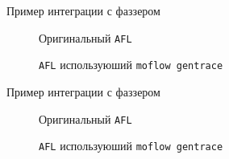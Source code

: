 \documentclass[10pt]{beamer}
\begin{document}
\begin{frame}{Пример интеграции с фаззером}
\begin{figure}[H]
    \caption{Оригинальный \texttt{AFL}}
\end{figure}
\begin{figure}[H]
      \caption{\texttt{AFL} используюший \texttt{moflow gentrace}}
\end{figure}

\end{frame}

\begin{frame}{Пример интеграции с фаззером}
\begin{figure}[H]
    \caption{Оригинальный \texttt{AFL}}
\end{figure}
\begin{figure}[H]
      \caption{\texttt{AFL} используюший \texttt{moflow gentrace}}
\end{figure}

\end{frame}
\end{document}

